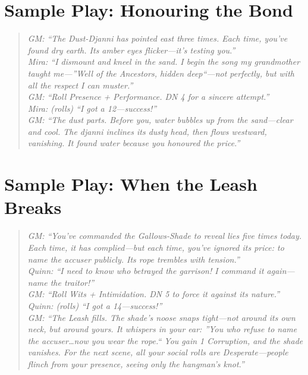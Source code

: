 \documentclass[11pt,twoside]{book}
\begin{document}
\section{Sample Play: Honouring the Bond}
\begin{quote}
\textit{GM: ``The Dust-Djanni has pointed east three times. Each time, you've found dry earth. Its amber eyes flicker---it's testing you.''} \\
\textit{Mira: ``I dismount and kneel in the sand. I begin the song my grandmother taught me---''Well of the Ancestors, hidden deep``---not perfectly, but with all the respect I can muster.''} \\
\textit{GM: ``Roll Presence + Performance. DN 4 for a sincere attempt.''} \\
\textit{Mira: (rolls) ``I got a 12---success!''} \\
\textit{GM: ``The dust parts. Before you, water bubbles up from the sand---clear and cool. The djanni inclines its dusty head, then flows westward, vanishing. It found water because you honoured the price.''}
\end{quote}

\section{Sample Play: When the Leash Breaks}
\begin{quote}
\textit{GM: ``You've commanded the Gallows-Shade to reveal lies five times today. Each time, it has complied---but each time, you've ignored its price: to name the accuser publicly. Its rope trembles with tension.''} \\
\textit{Quinn: ``I need to know who betrayed the garrison! I command it again---name the traitor!''} \\
\textit{GM: ``Roll Wits + Intimidation. DN 5 to force it against its nature.''} \\
\textit{Quinn: (rolls) ``I got a 14---success!''} \\
\textit{GM: ``The Leash fills. The shade's noose snaps tight---not around its own neck, but around yours. It whispers in your ear: ''You who refuse to name the accuser\dots now you wear the rope.`` You gain 1 Corruption, and the shade vanishes. For the next scene, all your social rolls are Desperate---people flinch from your presence, seeing only the hangman's knot.''}
\end{quote}

\end{document}
